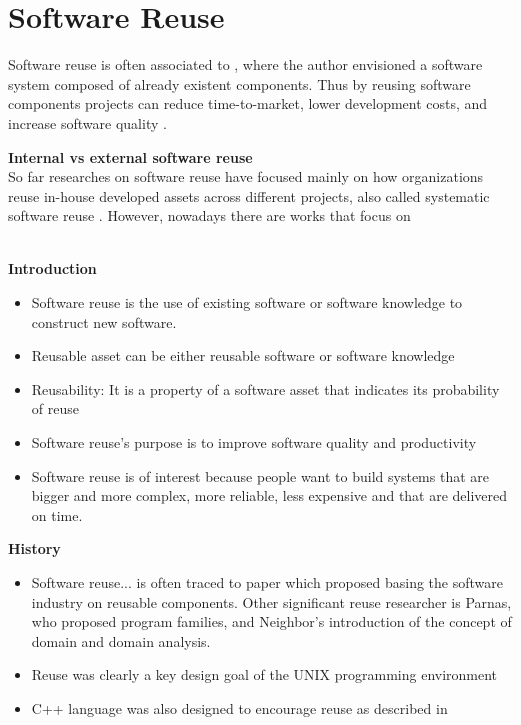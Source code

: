 \chapter{Software Reuse}
\label{chap:sw-reuse}

Software reuse is often associated to \cite{McIlroy1968}, where the author envisioned a software system composed of already existent components. Thus by reusing software components projects can reduce time-to-market, lower development costs, and increase software quality \cite{Frakes2005}. 

\textbf{Internal vs external software reuse}\\
So far researches on software reuse have focused mainly on how organizations reuse in-house developed assets across different projects, also called systematic software reuse \cite{Stefi2016}. However, nowadays there are works that focus on 

\cite{Frakes2005} \\

\textbf{Introduction}
\begin{itemize}
\item Software reuse is the use of existing software or software knowledge to construct new software.
\item Reusable asset can be either reusable software or software knowledge
\item Reusability: It is a property of a software asset that indicates its probability of reuse 
\item Software reuse's purpose is to improve software quality and productivity
\item Software reuse is of interest because people want to build systems that are bigger and more complex, more reliable, less expensive and that are delivered on time.
\end{itemize}

\textbf{History}
\begin{itemize}
\item Software reuse... is often traced to \cite{McIlroy1968} paper which proposed basing the software industry on reusable components. Other significant reuse researcher is Parnas, who proposed program families, and Neighbor's introduction of the concept of domain and domain analysis.
\item Reuse was clearly a key design goal of the UNIX programming environment
\item C++ language was also designed to encourage reuse as described in \cite{Stroustrup}
\end{itemize}


